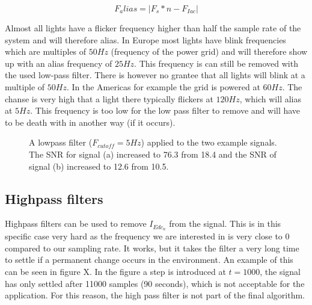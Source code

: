 \begin{equation}
\label{Falias}
	F_alias = |F_{s} * n - F_{Iac}|
\end{equation}

Almost all lights have a flicker frequency higher than half the sample rate of the system and will therefore alias. In Europe most lights have blink frequencies which are multiples of $50Hz$ (frequency of the power grid) and will therefore show up with an alias frequency of $25Hz$. This frequency is can still be removed with the used low-pass filter. There is however no grantee that all lights will blink at a multiple of $50Hz$. In the Americas for example the grid is powered at $60Hz$. The chanse is very high that a light there typically flickers at $120Hz$, which will alias at $5Hz$. This frequency is too low for the low pass filter to remove and will have to be death with in another way (if it occurs).

\begin{figure}
	\centering     %
	\label{lowpass_example}
	\caption{A lowpass filter ($F_{cutoff} = 5Hz$) applied to the two example signals. The SNR for signal (a) increased to 76.3 from 18.4 and the SNR of signal (b) increased to 12.6 from 10.5.}
\end{figure}

\subsection{Highpass filters}
Highpass filters can be used to remove $I_{Edc_{n}}$ from the signal. This is in this specific case very hard as the frequency we are interested in is very close to 0 compared to our sampling rate. It works, but it takes the filter a very long time to settle if a permanent change occurs in the environment. An example of this can be seen in figure X. In the figure a step is introduced at $t = 1000$, the signal has only settled after 11000 samples (90 seconds), which is not acceptable for the application. For this reason, the high pass filter is not part of the final algorithm.

